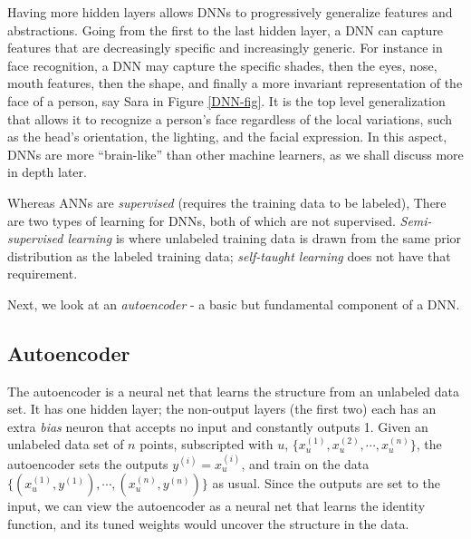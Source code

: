 \documentclass[12pt]{article}  %
\begin{document}
Having more hidden layers allows DNNs to progressively generalize features and abstractions. Going from the first to the last hidden layer, a DNN can capture features that are decreasingly specific and increasingly generic. For instance in face recognition, a DNN may capture the specific shades, then the eyes, nose, mouth features, then the shape, and finally a more invariant representation of the face of a person, say Sara in Figure \ref{DNN-fig}. It is the top level generalization that allows it to recognize a person's face regardless of the local variations, such as the head's orientation, the lighting, and the facial expression. In this aspect, DNNs are more ``brain-like'' than other machine learners, as we shall discuss more in depth later.


Whereas ANNs are \emph{supervised} (requires the training data to be labeled), There are two types of learning for DNNs, both of which are not supervised. \emph{Semi-supervised learning} is where unlabeled training data is drawn from the same prior distribution as the labeled training data; \emph{self-taught learning} does not have that requirement.

Next, we look at an \emph{autoencoder} - a basic but fundamental component of a DNN.

\subsection{Autoencoder}

The autoencoder is a neural net that learns the structure from an unlabeled data set. It has one hidden layer; the non-output layers (the first two) each has an extra \emph{bias} neuron that accepts no input and constantly outputs 1. Given an unlabeled data set of $n$ points, subscripted with $u$, $\{x^{(1)}_u, x^{(2)}_u, \cdots, x^{(n)}_u \}$, the autoencoder sets the outputs $y^{(i)} = x^{(i)}_u$, and train on the data $\{(x^{(1)}_u, y^{(1)}), \cdots, (x^{(n)}_u, y^{(n)}) \}$ as usual. Since the outputs are set to the input, we can view the autoencoder as a neural net that learns the identity function, and its tuned weights would uncover the structure in the data.
\end{document}
